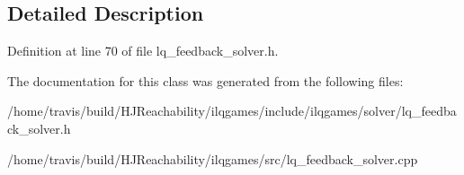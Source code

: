 \subsection{Detailed Description}


Definition at line 70 of file lq\+\_\+feedback\+\_\+solver.\+h.



The documentation for this class was generated from the following files\+:\begin{DoxyCompactItemize}
\item 
/home/travis/build/\+H\+J\+Reachability/ilqgames/include/ilqgames/solver/lq\+\_\+feedback\+\_\+solver.\+h\item 
/home/travis/build/\+H\+J\+Reachability/ilqgames/src/lq\+\_\+feedback\+\_\+solver.\+cpp\end{DoxyCompactItemize}
